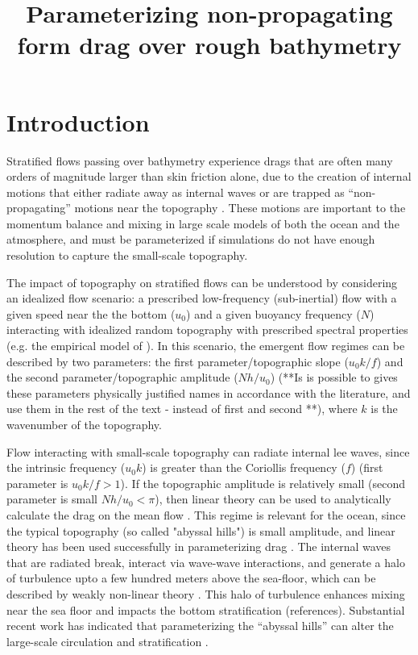 \documentclass[twocol]{ametsocV5}
\title{Parameterizing non-propagating form drag over rough bathymetry}
\affiliation{University of Victoria, Victoria, BC, Canada}
\begin{document}
\maketitle

\section{Introduction}

Stratified flows passing over bathymetry experience drags that are often many orders of magnitude larger than skin friction alone, due to the creation of internal motions that either radiate away as internal waves \citep{bell75a} or are trapped as ``non-propagating'' motions near the topography \citep[i.e.][]{bacmeisterpierrhumbert88}. These motions are important to the momentum balance and mixing in large scale models of both the ocean and the atmosphere, and must be parameterized if simulations do not have enough resolution to capture the small-scale topography.  

The impact of topography on stratified flows can be understood by considering an idealized flow scenario: a prescribed low-frequency (sub-inertial) flow with a given speed near the the bottom ($u_0$)  and a given buoyancy frequency ($N$) interacting with idealized random topography with prescribed spectral properties (e.g. the empirical model of \citet{goffarbic10}). In this scenario, the emergent flow regimes can be described by two parameters: the first parameter/topographic slope ($u_0 k /f$) and the second parameter/topographic amplitude ($Nh/u_0$) (**Is is possible to gives these parameters physically justified names in accordance with the literature, and use them in the rest of the text - instead of first and second **), where $k$ is the wavenumber of the topography. 

Flow interacting with small-scale topography can radiate internal lee waves, since the intrinsic frequency ($u_0k$) is greater than the Coriollis frequency ($f$) (first parameter is $u_0 k /f >1$). If the topographic amplitude is relatively small (second parameter is small $Nh/u_0< \pi$), then linear theory can be used to analytically calculate the drag on the mean flow \citep{bell75a}. This regime is relevant for the ocean, since the typical topography (so called "abyssal hills") is small amplitude, and linear theory has been used successfully in parameterizing drag \citep{nikurashinferrari10a,nikurashinferrari14}. The internal waves that are radiated break, interact via wave-wave interactions, and generate a halo of turbulence upto a few hundred meters above the sea-floor, which can be described by weakly non-linear theory \citep{polzin09}. This halo of turbulence enhances mixing near the sea floor and impacts the bottom stratification (references). Substantial recent work has indicated that parameterizing the ``abyssal hills'' can alter the large-scale circulation and stratification \citep[i.e.]{meletetal13, de_Lavergne_2017}.  
\end{document}
